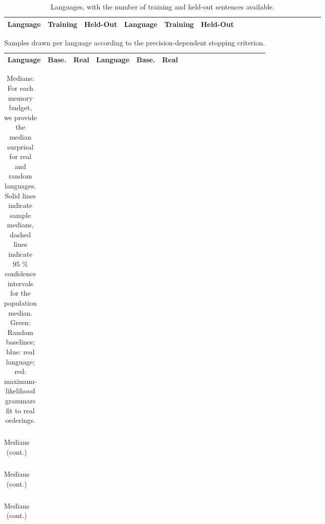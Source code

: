 \documentclass[11pt,letterpaper]{article}
\begin{document}
\begin{table}
\begin{longtable}{l|ll||l|llllllllllllll}
	Language & Training & Held-Out & 	Language & Training & Held-Out\\ \hline

\end{longtable}
	\caption{Languages, with the number of training and held-out sentences available.}\label{tab:corpora}
\end{table}

\begin{table}
\begin{longtable}{l|ll||l|llllllllllllll}
	Language & Base. & Real & Language & Base. & Real \\ \hline

\end{longtable}
	\caption{Samples drawn per language according to the precision-dependent stopping criterion.}\label{tab:samples}
\end{table}

\begin{table}
\begin{longtable}{ccccccccccccccclll}

\end{longtable}
	\caption{Medians: For each memory budget, we provide the median surprisal for real and random languages. Solid lines indicate sample medians, dashed lines indicate 95 \% confidence intervals for the population median. Green: Random baselines; blue: real language; red: maximum-likelihood grammars fit to real orderings.}\label{tab:medians}
\end{table}

\begin{table}
\begin{longtable}{ccccccccccccccclll}

\end{longtable}
	\caption{Medians (cont.)}
\end{table}

\begin{table}
\begin{longtable}{ccccccccccccccclll}

\end{longtable}
	\caption{Medians (cont.)}
\end{table}

\begin{table}
\begin{longtable}{ccccccccccccccclll}

\end{longtable}
	\caption{Medians (cont.)}
\end{table}
\end{document}
